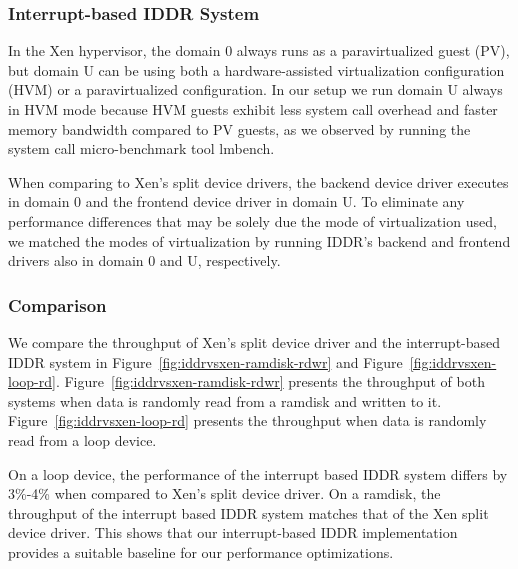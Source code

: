 \subsubsection*{Interrupt-based IDDR System}
In the Xen hypervisor, the domain 0 always runs as a paravirtualized guest (PV),
but domain U can be using both a hardware-assisted virtualization configuration (HVM) 
or a paravirtualized configuration.  In our setup we run domain U always
in HVM mode because HVM guests exhibit less system call overhead
and faster memory bandwidth compared to PV guests, as we observed
by running the system call micro-benchmark tool lmbench\cite{lmbench}. 

When comparing to Xen's split device drivers, the backend device driver executes
in domain 0 and the frontend device driver in domain U.  
To eliminate any performance differences that may be solely due the mode
of virtualization used, we matched the modes of virtualization
by running IDDR's backend and frontend drivers also in 
domain 0 and U, respectively.

\subsubsection*{Comparison}
We compare the throughput of Xen's split device driver and the
interrupt-based IDDR system in Figure~\ref{fig:iddrvsxen-ramdisk-rdwr}
and Figure~\ref{fig:iddrvsxen-loop-rd}. 
Figure~\ref{fig:iddrvsxen-ramdisk-rdwr} presents the
throughput of both systems when data is randomly read from a ramdisk and
written to it. Figure~\ref{fig:iddrvsxen-loop-rd} presents the throughput
when data is randomly read from a loop device.

On a loop device, the performance of the interrupt based IDDR system
differs by 3\%-4\% when compared to Xen's split device driver. On a
ramdisk, the throughput of the interrupt based IDDR system matches that
of the Xen split device driver. This shows that our interrupt-based
IDDR implementation provides a suitable baseline for our performance 
optimizations.

